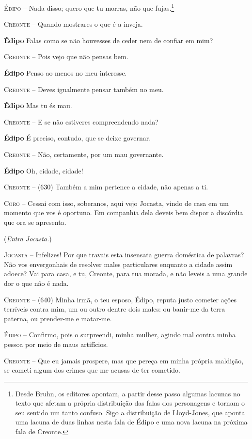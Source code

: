 \textsc{Édipo} --   Nada disso; quero que tu morras, não que fujas.\footnote{Desde Bruhn, os editores apontam, a partir desse
  passo algumas lacunas no texto que afetam a própria distribuição das
  falas dos personagens e tornam o seu sentido um tanto confuso. Sigo a
  distribuição de Lloyd-Jones, que aponta uma lacuna de duas linhas
  nesta fala de Édipo e uma nova lacuna na próxima fala de Creonte.}

\textsc{Creonte} --   Quando mostrares o que é a inveja.

\textbf{Édipo}  Falas como se não houvesses de ceder nem de confiar em mim?

\textsc{Creonte} --   Pois vejo que não pensas bem.

\textbf{Édipo}  Penso ao menos no meu interesse.

\textsc{Creonte} --   Deves igualmente pensar também no meu.

\textbf{Édipo}  Mas tu és mau.

\textsc{Creonte} --   E se não estiveres compreendendo nada?

\textbf{Édipo}  É preciso, contudo, que se deixe governar.

\textsc{Creonte} --   Não, certamente, por um mau governante.

\textbf{Édipo}  Oh, cidade, cidade!

\textsc{Creonte} --   (630) Também a mim pertence a cidade, não apenas a ti.

\textsc{Coro} --   Cessai com isso, soberanos, aqui vejo Jocasta, vindo de casa em um
momento que vos é oportuno. Em companhia dela deveis bem dispor a
discórdia que ora se apresenta.

(\emph{Entra Jocasta.})

\textsc{Jocasta} --   Infelizes! Por que travais esta insensata guerra doméstica de palavras?
Não vos envergonhais de resolver males particulares enquanto a cidade
assim adoece? Vai para casa, e tu, Creonte, para tua morada, e não
leveis a uma grande dor o que não é nada.

\textsc{Creonte} --   (640) Minha irmã, o teu esposo, Édipo, reputa justo cometer ações
terríveis contra mim, um ou outro dentre dois males: ou banir-me da
terra paterna, ou prender-me e matar-me.

\textsc{Édipo} --   Confirmo, pois o surpreendi, minha mulher, agindo mal contra minha
pessoa por meio de maus artifícios.

\textsc{Creonte} --   Que eu jamais prospere, mas que pereça em minha própria maldição, se
cometi algum dos crimes que me acusas de ter cometido.

